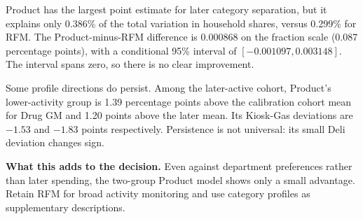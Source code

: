 Product has the largest point estimate for later category separation, but it explains only 0.386\% of the total variation in household shares, versus 0.299\% for RFM. The Product-minus-RFM difference is $0.000868$ on the fraction scale (0.087 percentage points), with a conditional 95\% interval of $[-0.001097,0.003148]$. The interval spans zero, so there is no clear improvement.

Some profile directions do persist. Among the later-active cohort, Product's lower-activity group is 1.39 percentage points above the calibration cohort mean for Drug GM and 1.20 points above the later mean. Its Kiosk-Gas deviations are $-1.53$ and $-1.83$ points respectively. Persistence is not universal: its small Deli deviation changes sign.

\textbf{What this adds to the decision.} Even against department preferences rather than later spending, the two-group Product model shows only a small advantage. Retain RFM for broad activity monitoring and use category profiles as supplementary descriptions.

